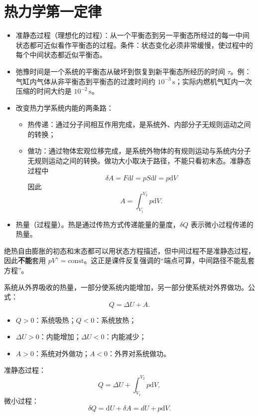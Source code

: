 

\chapter{热力学第一定律}

\begin{definition}
    \begin{itemize}
    \item 准静态过程（理想化的过程）：从一个平衡态到另一平衡态所经过的每一中间状态都可近似看作平衡态的过程。条件：状态变化必须非常缓慢，使过程中的每个中间状态都近似平衡态。
    \item 弛豫时间是一个系统的平衡态从破坏到恢复到新平衡态所经历的时间 \(\tau\)。例：气缸内气体从非平衡态到平衡态的过渡时间约 \(10^{-3}\,\text{s}\)；实际内燃机气缸内一次压缩的时间大约是 \(10^{-2}\,\text{s}\)。
    \item 改变热力学系统内能的两条路：
    \begin{itemize}
    \item 热传递：通过分子间相互作用完成，是系统外、内部分子无规则运动之间的转换；
    \item 做功：通过物体宏观位移完成，是系统外物体的有规则运动与系统内分子无规则运动之间的转换。做功大小取决于路径，不能只看初末态。准静态过程中\[\delta A = F\mathrm dl = pS\mathrm dl = p\mathrm dV\]因此\[A=\int_{V_1}^{V_2}p\mathrm dV.\]
    \end{itemize}
    \item 热量（过程量）。热是通过传热方式传递能量的量度，\(\delta Q\) 表示微小过程传递的热量。
    \end{itemize}
\end{definition}
绝热自由膨胀的初态和末态都可以用状态方程描述，但中间过程不是准静态过程，因此\textbf{不能}套用 \(pV^\gamma=\text{const}\)。这正是课件反复强调的“端点可算，中间路径不能乱套方程”。
\begin{theorem}[热力学第一定律]
系统从外界吸收的热量，一部分使系统内能增加，另一部分使系统对外界做功。公式：
\[
Q=\Delta U+A.
\]
\begin{itemize}
    \item \(Q>0\)：系统吸热；\(Q<0\)：系统放热；
    \item \(\Delta U>0\)：内能增加；\(\Delta U<0\)：内能减少；
    \item \(A>0\)：系统对外做功；\(A<0\)：外界对系统做功。
\end{itemize}
准静态过程：\[
Q=\Delta U+\int_{V_1}^{V_2}p\mathrm dV,
\]微小过程：\[
\delta Q=\mathrm dU+\delta A=dU+p\mathrm dV.
\]
\end{theorem}


